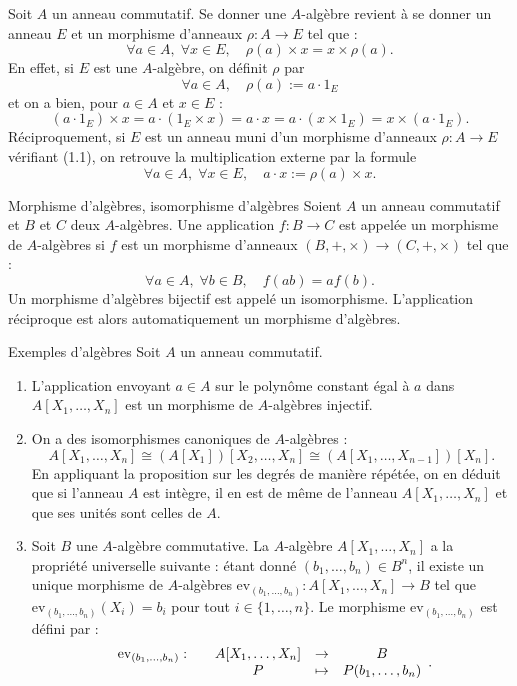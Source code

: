 \documentclass[]{report}
\begin{document}
\begin{re}{}{}
    Soit $A$ un anneau commutatif. Se donner une $A$-algèbre revient à se donner un anneau $E$ et un morphisme d'anneaux $\rho : A \to E$ tel que :
    \[\forall a \in A, \; \forall x \in E, \quad \rho(a) \times x = x \times \rho(a). \tag{1.1}\]
    En effet, si $E$ est une $A$-algèbre, on définit $\rho$ par
    \[\forall a \in A, \quad \rho(a) := a \cdot 1_E\]
    et on a bien, pour $a \in A$ et $x \in E$ :
    \[(a \cdot 1_E) \times x = a \cdot (1_E \times x) = a \cdot x = a \cdot (x \times 1_E) = x \times (a \cdot 1_E).\]
    Réciproquement, si $E$ est un anneau muni d'un morphisme d'anneaux $\rho : A \to E$ vérifiant (1.1), on retrouve la multiplication externe par la formule
    \[\forall a \in A, \; \forall x \in E, \quad a \cdot x := \rho(a) \times x.\]
\end{re}

\begin{df}{Morphisme d'algèbres, isomorphisme d'algèbres}{}
    Soient $A$ un anneau commutatif et $B$ et $C$ deux $A$-algèbres. Une application $f : B \to C$ est appelée un morphisme de $A$-algèbres si $f$ est un morphisme d'anneaux $(B, +, \times) \to (C, +, \times)$ tel que :
    \[\forall a \in A, \; \forall b \in B, \quad f(ab) = af(b).\]
    Un morphisme d'algèbres bijectif est appelé un isomorphisme. L'application réciproque est alors automatiquement un morphisme d'algèbres.
\end{df}

\begin{ex}{Exemples d'algèbres}{}
    Soit $A$ un anneau commutatif.
    \begin{enumerate}
        \item L'application envoyant $a \in A$ sur le polynôme constant égal à $a$ dans $A[X_1, \ldots, X_n]$ est un morphisme de $A$-algèbres injectif.
        \item On a des isomorphismes canoniques de $A$-algèbres :
        \[A[X_1, \dots, X_n] \cong (A[X_1])[X_2, \dots, X_n] \cong (A[X_1, \dots, X_{n-1}])[X_n].\]
        En appliquant la proposition sur les degrés de manière répétée, on en déduit que si l'anneau $A$ est intègre, il en est de même de l'anneau $A[X_1, \ldots, X_n]$ et que ses unités sont celles de $A$.
        \item Soit $B$ une $A$-algèbre commutative. La $A$-algèbre $A[X_1, \ldots, X_n]$ a la propriété universelle suivante : étant donné $(b_1, \ldots, b_n) \in B^n$, il existe un unique morphisme de $A$-algèbres $\mathrm{ev}_{(b_1, \ldots, b_n)} : A[X_1, \ldots, X_n] \to B$ tel que $\mathrm{ev}_{(b_1, \ldots, b_n)}(X_i) = b_i$ pour tout $i \in \{1, \ldots, n\}$. Le morphisme $\mathrm{ev}_{(b_1, \ldots, b_n)}$ est défini par :
        \[\begin{array}{ccccc} \mathrm{ev}_{(b_1, \dots, b_n)} : & & A[X_1, \dots, X_n] & \to & B \\ & & P & \mapsto & P(b_1, \dots, b_n) \end{array}.\]
    \end{enumerate}
\end{ex}
\end{document}
